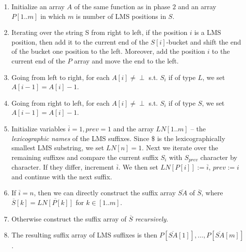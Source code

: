 \begin{enumerate}
\item Initialize an array $A$ of the same function as in phase $2$ and an array $P[1..m]$ in which $m$ is number of LMS positions in $S$.
\item Iterating over the string S from right to left, if the position $i$ is a LMS position, then add it to the current end of the $S[i]$-bucket and shift the end of the bucket one position to the left. Moreover, add the position $i$ to the current end of the $P$ array and move the end to the left. 
\item Going from left to right, for each $A[i] \neq 		\perp$ s.t. $S_i$ if of type $L$, we set $A[i-1] = 			A[i] - 1$. \label{IS-phase2-step2}
\item Going from right to left, for each $A[i] \neq 		\perp$ s.t. $S_i$ if of type $S$, we set $A[i-1] = 			A[i] - 1$. \label{IS-phase2-step3}
\item Initialize variables $\overline{i} = 1, prev = 1$ and the array $LN[1..m]$ -- the \textit{lexicographic names} of the LMS suffixes. Since $\$$ is the lexicographically smallest LMS substring, we set $LN[n] = 1$. Next we iterate over the remaining suffixes and compare the current suffix $S_i$ with $S_{prev}$ character by character. If they differ, increment $\overline{i}$. We then set $LN[P[i]] := \overline{i}$, $prev := i$ and continue with the next suffix.
\item If $\overline{i} = n$, then we can directly construct the suffix array $\overline{SA}$ of $\overline{S}$, where $\overline{S}[k] = \overline{LN[P[k]]}$ for $k \in [1..m]$.
\item Otherwise construct the suffix array of $\overline{S}$ \textit{recursively}.
\item The resulting suffix array of LMS suffixes is then $P[\overline{SA}[1]], \ldots, P[\overline{SA}[m]]$.
\end{enumerate} 

